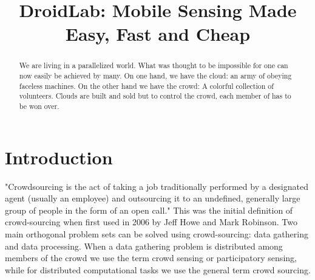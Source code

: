 \documentclass[conference,letterpaper]{IEEEtran}
\begin{document}

\title{DroidLab: Mobile Sensing Made Easy, Fast and Cheap}
\author{
  }




\maketitle


\begin{abstract}
We are living in a parallelized world. What was thought to be impossible for one can now easily be achieved by many. On one hand, we have the cloud: an army of obeying faceless machines. On the other hand we have the crowd: A colorful collection of volunteers. Clouds are built and sold but to control the crowd, each member of has to be won over.
\end{abstract}

\begin{IEEEkeywords}
\end{IEEEkeywords}
 
\section{Introduction}
\label{sec:intro}
"Crowdsourcing is the act of taking a job traditionally performed by a designated agent (usually an employee) and outsourcing it to an undefined, generally large group of people in the form of an open call." This was the initial definition of crowd-sourcing when first used in 2006  by Jeff Howe and Mark Robinson. Two main orthogonal problem sets can be solved using crowd-sourcing: data gathering and data processing. When a data gathering problem is distributed among members of the crowd we use the term crowd sensing or participatory sensing, while for distributed computational tasks we use the general term crowd sourcing.
\end{document}
